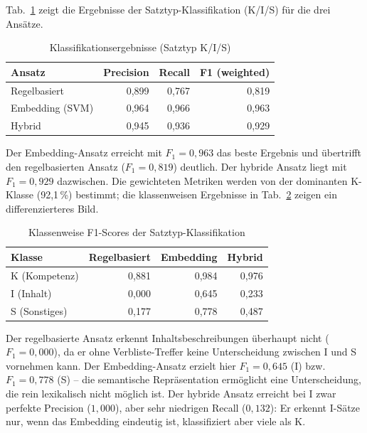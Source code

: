 Tab.~\ref{tab:eval-klassifikation} zeigt die Ergebnisse der Satztyp-Klassifikation (K/I/S) für die drei Ansätze.

\begin{table}[H]
\caption{Klassifikationsergebnisse (Satztyp K/I/S)\label{tab:eval-klassifikation}}
\centering
\begin{tabular}{lrrr}
\hline
\textbf{Ansatz} & \textbf{Precision} & \textbf{Recall} & \textbf{F1 (weighted)} \\
\hline
Regelbasiert & 0{,}899 & 0{,}767 & 0{,}819 \\
Embedding (SVM) & 0{,}964 & 0{,}966 & 0{,}963 \\
Hybrid & 0{,}945 & 0{,}936 & 0{,}929 \\
\hline
\end{tabular}
\end{table}

Der Embedding-Ansatz erreicht mit $F_1 = 0{,}963$ das beste Ergebnis und übertrifft den regelbasierten Ansatz ($F_1 = 0{,}819$) deutlich.
Der hybride Ansatz liegt mit $F_1 = 0{,}929$ dazwischen.
Die gewichteten Metriken werden von der dominanten K-Klasse (92{,}1\,\%) bestimmt; die klassenweisen Ergebnisse in Tab.~\ref{tab:eval-klassifikation-detail} zeigen ein differenzierteres Bild.

\begin{table}[H]
\caption{Klassenweise F1-Scores der Satztyp-Klassifikation\label{tab:eval-klassifikation-detail}}
\centering
\begin{tabular}{lrrr}
\hline
\textbf{Klasse} & \textbf{Regelbasiert} & \textbf{Embedding} & \textbf{Hybrid} \\
\hline
K (Kompetenz) & 0{,}881 & 0{,}984 & 0{,}976 \\
I (Inhalt) & 0{,}000 & 0{,}645 & 0{,}233 \\
S (Sonstiges) & 0{,}177 & 0{,}778 & 0{,}487 \\
\hline
\end{tabular}
\end{table}

Der regelbasierte Ansatz erkennt Inhaltsbeschreibungen überhaupt nicht ($F_1 = 0{,}000$), da er ohne Verbliste-Treffer keine Unterscheidung zwischen I und S vornehmen kann.
Der Embedding-Ansatz erzielt hier $F_1 = 0{,}645$ (I) bzw.\ $F_1 = 0{,}778$ (S) -- die semantische Repräsentation ermöglicht eine Unterscheidung, die rein lexikalisch nicht möglich ist.
Der hybride Ansatz erreicht bei I zwar perfekte Precision ($1{,}000$), aber sehr niedrigen Recall ($0{,}132$): Er erkennt I-Sätze nur, wenn das Embedding eindeutig ist, klassifiziert aber viele als K.


